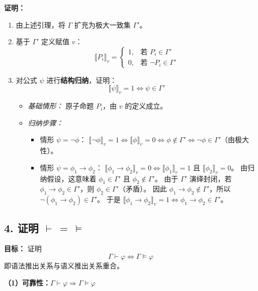 \documentclass[12pt, a4paper]{article}
\begin{document}
\textbf{证明：}
\begin{enumerate}
    \item 由上述引理，将 $\Gamma$ 扩充为极大一致集 $\Gamma'$。
    \item 基于 $\Gamma'$ 定义赋值 $v$：
    \[
    \llbracket P_i \rrbracket_v = 
    \begin{cases} 
    1, & \text{若 } P_i \in \Gamma' \\
    0, & \text{若 } \neg P_i \in \Gamma'
    \end{cases}
    \]
    \item 对公式 $\psi$ 进行\textbf{结构归纳}，证明：
    \[
    \llbracket \psi \rrbracket_v = 1 \iff \psi \in \Gamma'
    \]
    \begin{itemize}
        \item \textit{基础情形：} 原子命题 $P_i$，由 $v$ 的定义成立。
        \item \textit{归纳步骤：}
        \begin{itemize}
            \item 情形 $\psi = \neg \phi$：
            $\llbracket \neg \phi \rrbracket_v = 1 \iff \llbracket \phi \rrbracket_v = 0 \iff \phi \notin \Gamma' \iff \neg \phi \in \Gamma'$（由极大性）。
            \item 情形 $\psi = \phi_1 \to \phi_2$：
            $\llbracket \phi_1 \to \phi_2 \rrbracket_v = 0 \iff \llbracket \phi_1 \rrbracket_v = 1 \text{ 且 } \llbracket \phi_2 \rrbracket_v = 0$。
            由归纳假设，这意味着 $\phi_1 \in \Gamma'$ 且 $\phi_2 \notin \Gamma'$。
            由于 $\Gamma'$ 演绎封闭，若 $\phi_1 \to \phi_2 \in \Gamma'$，则 $\phi_2 \in \Gamma'$（矛盾）。
            因此 $\phi_1 \to \phi_2 \notin \Gamma'$，所以 $\neg(\phi_1 \to \phi_2) \in \Gamma'$。
            于是 $\llbracket \phi_1 \to \phi_2 \rrbracket_v = 1 \iff \phi_1 \to \phi_2 \in \Gamma'$。
        \end{itemize}
    \end{itemize}
\end{enumerate}

\subsection*{4. 证明 $\vdash \,=\, \models$}

\textbf{目标：} 证明
\[
\Gamma \vdash \varphi \iff \Gamma \models \varphi
\]
即语法推出关系与语义推出关系重合。

\vspace{0.3cm}
\textbf{（1）可靠性：$\Gamma \vdash \varphi \Rightarrow \Gamma \models \varphi$}
\end{document}
